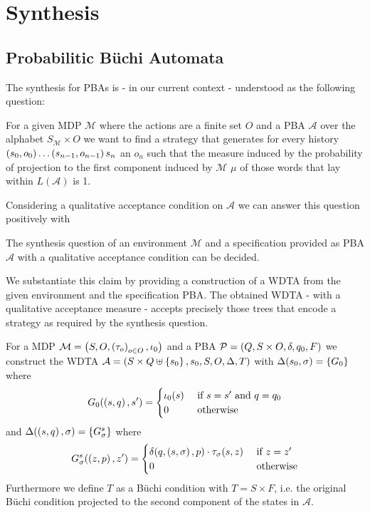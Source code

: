 \chapter{Synthesis}
\section{Probabilitic Büchi Automata}
The synthesis for \acp{PBA} is - in our current context - understood as the
following question:
\begin{definition}
  For a given \ac{MDP} $\mathcal{M}$ where the actions are a finite set $O$ and
  a \ac{PBA} $\mathcal{A}$ over the alphabet $S_{\mathcal{M}}\times O$ we want
  to find a strategy that generates for every history
  $\left(s_{0}, o_{0}\right)\dots\left(s_{n-1},o_{n-1}\right)s_{n}$ an
  $o_{n}$ such that the measure induced by the probability of projection to the
  first component induced by $\mathcal{M}$ $\mu$ of those words that lay within
  $L(\mathcal{A})$ is 1.
\end{definition}
Considering a qualitative acceptance condition on $\mathcal{A}$ we can answer
this question positively with
\begin{theorem}
  The synthesis question of an environment $\mathcal{M}$ and a specification
  provided as \ac{PBA} $\mathcal{A}$ with a qualitative acceptance condition
  can be decided.
\end{theorem}
We substantiate this claim by providing a construction of a \ac{WDTA} from the
given environment and the specification \ac{PBA}. The obtained \ac{WDTA} - with
a qualitative acceptance measure - accepts precisely those trees that encode a
strategy as required by the synthesis question.
\begin{definition}
  For a \ac{MDP} $\mathcal{M} = \left(S, O, \left(\tau_{o}\right)_{o\in O},
  \iota_{0}\right)$ and a \ac{PBA} $\mathcal{P} = \left(Q, S\times O, \delta, q_{0},
  F\right)$ we construct the \ac{WDTA}
  $\mathcal{A} = \left(S\times Q\uplus\left\{s_{0}\right\}, s_{0}, S, O, \Delta,
  T\right)$ with $\Delta(s_{0}, \sigma) = \left\{G_{0}\right\}$ where
  \begin{equation*}
    G_{0}(\left(s,q\right), s') =
    \begin{cases}
      \iota_{0}(s)&\text{ if }s = s'\text{ and }q = q_{0}\\
      0 &\text{ otherwise}
    \end{cases}
  \end{equation*}
  and $\Delta(\left(s, q\right), \sigma) = \left\{G^{s}_{\sigma}\right\}$ where
  \begin{equation*}
    G^{s}_{\sigma}(\left(z,p\right), z') =
    \begin{cases}
      \delta(q, \left(s,\sigma\right), p)\cdot\tau_{\sigma}(s,z)&\text{ if }z = z'\\
      0 &\text{ otherwise}
    \end{cases}
  \end{equation*}
  Furthermore we define $T$ as a Büchi condition with $T = S\times F$, i.e. the
  original Büchi condition projected to the second component of the
  states in $\mathcal{A}$.
\end{definition}

